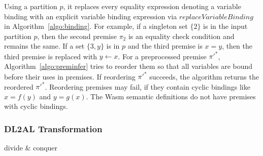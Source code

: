 Using a partition $p$, it replaces every equality expression denoting a variable binding 
with an explicit variable binding expression via $\mathit{replaceVariableBinding}$ in Algorithm~\ref{algo:binding}.
For example, if a singleton set $\{2\}$ is in the input partition $p$,
then the second premise $\pi_2$ is an equality check condition and remains the same.
If a set $\{3, y\}$ is in $p$ and the third premise is $x = y$,
then the third premise is replaced with $y \leftarrow x$.
For a preprocessed premise $\pi'^*$, Algorithm~\ref{algo:preminfer} tries to reorder them 
so that all variables are bound before their uses in premises.
If reordering $\pi'^*$ succeeds, the algorithm returns the reordered $\pi'^*$.
Reordering premises may fail, if they contain cyclic bindings like $x = f(y)$ and $y = g(x)$.
The Wasm semantic definitions do not have premises with cyclic bindings.


\subsubsection{DL2AL Transformation}
divide \& conquer
